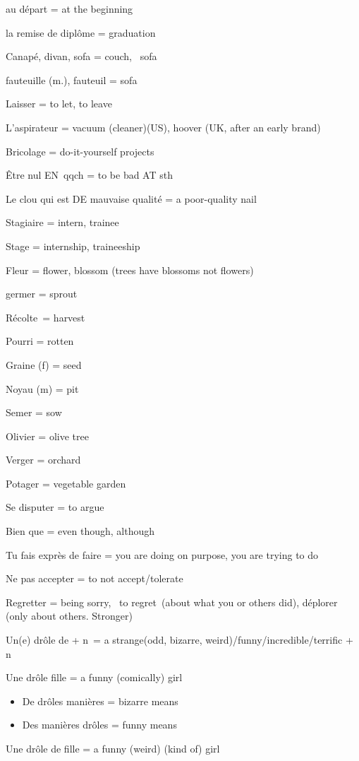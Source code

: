 au départ = at the beginning

la remise de diplôme = graduation

Canapé, divan, sofa = couch,~ sofa

fauteuille (m.), fauteuil = sofa

Laisser = to let, to leave

L'aspirateur = vacuum (cleaner)(US), hoover (UK, after an early brand)

Bricolage = do-it-yourself projects~

Être nul EN~qqch = to be bad AT sth

Le clou qui est DE mauvaise qualité = a poor-quality nail

Stagiaire = intern, trainee

Stage = internship, traineeship~

Fleur = flower, blossom (trees have blossoms not flowers)

germer = sprout

Récolte~= harvest~

Pourri = rotten~

Graine (f) = seed

Noyau (m) = pit

Semer = sow

Olivier = olive tree

Verger = orchard~

Potager = vegetable garden~

Se disputer = to argue~

Bien que = even though, although~

Tu fais exprès de faire = you are doing on purpose, you are trying to do

Ne pas accepter = to not accept/tolerate~

Regretter = being sorry,~ to regret~(about what you or others did),
déplorer (only about others. Stronger)

Un(e) drôle de + n~= a strange(odd, bizarre,
weird)/funny/incredible/terrific + n

Une drôle fille = a funny (comically) girl

\begin{itemize}
\item
  De drôles manières = bizarre means~
\item
  Des manières drôles = funny means~
\end{itemize}

Une drôle de fille = a funny (weird) (kind of) girl~

